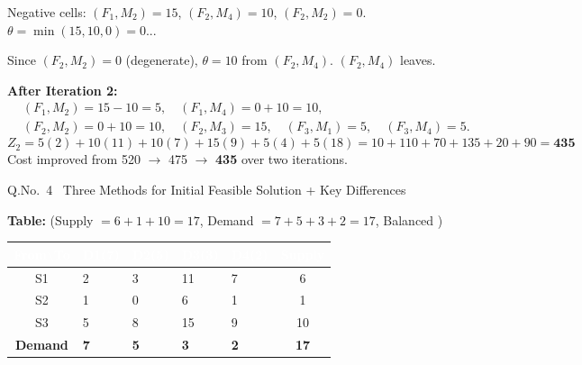 \documentclass[12pt]{article}
\begin{document}
\begin{ansbox}
Negative cells: $(F_1,M_2)=15$, $(F_2,M_4)=10$, $(F_2,M_2)=0$. $\theta=\min(15,10,0)=0$...

Since $(F_2,M_2)=0$ (degenerate), $\theta=10$ from $(F_2,M_4)$. $(F_2,M_4)$ leaves.

\textbf{After Iteration 2:}
\begin{align*}
  &(F_1,M_2)=15-10=5,\quad(F_1,M_4)=0+10=10,\\
  &(F_2,M_2)=0+10=10,\quad(F_2,M_3)=15,\quad(F_3,M_1)=5,\quad(F_3,M_4)=5.
\end{align*}
\[
  Z_2 = 5(2)+10(11)+10(7)+15(9)+5(4)+5(18) = 10+110+70+135+20+90 = \boxed{\mathbf{435}}
\]
Cost improved from 520 $\to$ 475 $\to$ \textbf{435} over two iterations.
\end{ansbox}

\newpage

\begin{qbox}{Q.No.\ 4 \textemdash\ Three Methods for Initial Feasible Solution + Key Differences}
\end{qbox}

\medskip
\textbf{Table:} (Supply $= 6+1+10=17$, Demand $= 7+5+3+2=17$, Balanced \checkmark)

\begin{center}
\begin{tabular}{|c|C{1.3cm}|C{1.3cm}|C{1.3cm}|C{1.3cm}|c|}
\hline
{}
\textcolor{white}{\textbf{From$\backslash$To}} & \textcolor{white}{\textbf{D1(7)}} & \textcolor{white}{\textbf{D2(5)}} & \textcolor{white}{\textbf{D3(3)}} & \textcolor{white}{\textbf{D4(2)}} & \textcolor{white}{\textbf{Supply}}\\
\hline
S1 & 2 & 3 & 11 & 7 & 6\\\hline
S2 & 1 & 0 & 6 & 1 & 1\\\hline
S3 & 5 & 8 & 15 & 9 & 10\\\hline
\textbf{Demand}&\textbf{7}&\textbf{5}&\textbf{3}&\textbf{2}&\textbf{17}\\\hline
\end{tabular}
\end{center}
\end{document}

